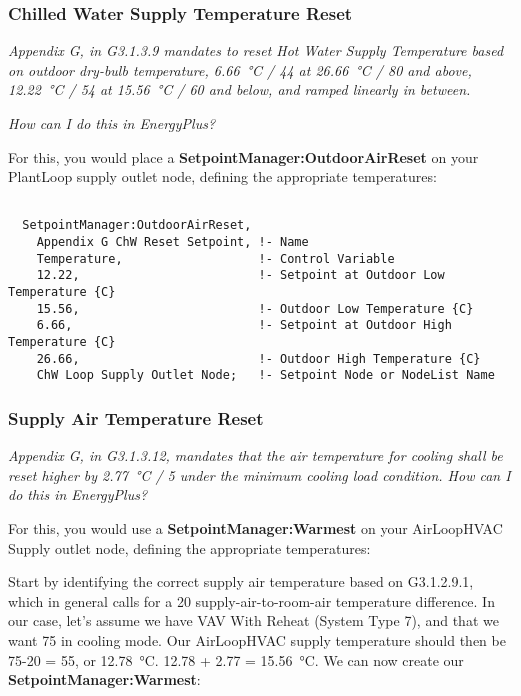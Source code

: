 \subsubsection{Chilled Water Supply Temperature Reset}%
\label{ssub:chilled_water_supply_temperature_reset}

\emph{Appendix G, in G3.1.3.9 mandates to reset Hot Water Supply Temperature based on outdoor dry-bulb temperature, \SI{6.66}{\celsius} / \SI{44}{\fahrenheit} at \SI{26.66}{\celsius}  / \SI{80}{\fahrenheit}  and above, \SI{12.22}{\celsius} / \SI{54}{\fahrenheit} at \SI{15.56}{\celsius} / \SI{60}{\fahrenheit} and below, and ramped linearly in between.}

\emph{How can I do this in EnergyPlus?}

For this, you would place a \textbf{SetpointManager:OutdoorAirReset} on your PlantLoop supply outlet node, defining the appropriate temperatures:

\begin{lstlisting}

  SetpointManager:OutdoorAirReset,
    Appendix G ChW Reset Setpoint, !- Name
    Temperature,                   !- Control Variable
    12.22,                         !- Setpoint at Outdoor Low Temperature {C}
    15.56,                         !- Outdoor Low Temperature {C}
    6.66,                          !- Setpoint at Outdoor High Temperature {C}
    26.66,                         !- Outdoor High Temperature {C}
    ChW Loop Supply Outlet Node;   !- Setpoint Node or NodeList Name

\end{lstlisting}




\subsubsection{Supply Air Temperature Reset}%
\label{ssub:supply_air_temperature_reset}

\emph{Appendix G, in G3.1.3.12, mandates that the air temperature for cooling shall be reset higher by \SI{2.77}{\celsius} / \SI{5}{\fahrenheit} under the minimum cooling load condition. How can I do this in EnergyPlus?}

For this, you would use a \textbf{SetpointManager:Warmest} on your AirLoopHVAC Supply outlet node, defining the appropriate temperatures:

Start by identifying the correct supply air temperature based on G3.1.2.9.1, which in general calls for a \SI{20}{\fahrenheit} supply-air-to-room-air temperature difference.
In our case, let's assume we have VAV With Reheat (System Type 7), and that we want \SI{75}{\fahrenheit} in cooling mode. Our AirLoopHVAC supply temperature should then be 75-20 = \SI{55}{\fahrenheit}, or \SI{12.78}{\celsius}. 12.78  + 2.77 = \SI{15.56}{\celsius}. We can now create our \textbf{SetpointManager:Warmest}:

